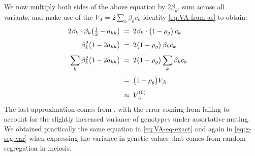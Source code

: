 \documentclass[12pt]{article}
\begin{document}
We now multiply both sides of the above equation by $2\beta_k$, sum across all variants, and make use of the $V_A = 2\sum_k \beta_k c_k$ identity \eqref{eq:VA-from-as} to obtain:
\begin{equation}\label{eq:c-decomp-sum}
\begin{aligned}
    2\beta_k \cdot \beta_k\big(\tfrac12 - a_{kk}\big) \;&=\; 2\beta_k \cdot \big(1-\rho_g\big)\, c_k \\[4pt]
    \beta_k^2\big(1 - 2a_{kk}\big) \;&=\; 2\big(1-\rho_g\big)\,\beta_k c_k \\[4pt]
    \sum_k \beta_k^2\big(1 - 2a_{kk}\big) \;&=\; 2\big(1-\rho_g\big)\sum_k \beta_k c_k \\[4pt]
    \;&=\; \big(1-\rho_g\big)V_A \\[4pt]
    \;&\approx\; V_A^{(0)}
\end{aligned}
\end{equation}
The last approximation comes from , with the error coming from failing to account for the slightly increased variance of genotypes under assortative mating.
We obtained practically the same equation in \eqref{eq:VA-eq-exact} and again in \eqref{eq:g-seg-var} when expressing the variance in genetic values that comes from random segregation in meiosis.
\end{document}
